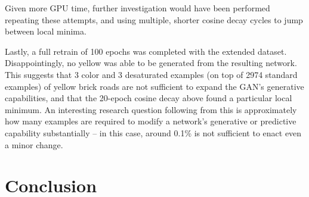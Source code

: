 \documentclass[10pt,twocolumn,letterpaper]{article}
\begin{document}
Given more GPU time, further investigation would have been performed repeating these attempts, and using multiple, shorter cosine decay cycles to jump between local minima.

Lastly, a full retrain of 100 epochs was completed with the extended dataset. Disappointingly, no yellow was able to be generated from the resulting network. This suggests that 3 color and 3 desaturated examples (on top of 2974 standard examples) of yellow brick roads are not sufficient to expand the GAN's generative capabilities, and that the 20-epoch cosine decay above found a particular local minimum. An interesting research question following from this is approximately how many examples are required to modify a network's generative or predictive capability substantially -- in this case, around 0.1\% is not sufficient to enact even a minor change.


\section{Conclusion}


{\small


}
\end{document}
